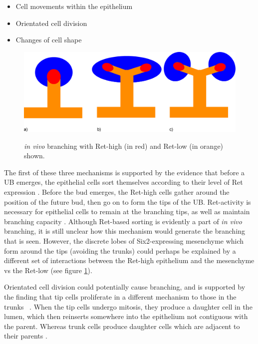 \documentclass[pdftex,10pt,a4paper,twocolumn]{article}
\begin{document}
\begin{itemize}
\item Cell movements within the epithelium
\item Orientated cell division
\item Changes of cell shape
\end{itemize}

\begin{figure}[t] 
\centering
\scalebox{0.2} 
{\includegraphics{UB_branch_ret.eps}}
\caption{\textit{in vivo} branching with Ret-high (in red) and Ret-low (in orange) shown.}\label{fig:branch_ret}
\end{figure} 

The first of these three mechanisms is supported by the evidence that before a UB emerges, the epithelial cells sort themselves according to their level of Ret expression \cite{Chi2009}. Before the bud emerges, the Ret-high cells gather around the position of the future bud, then go on to form the tips of the UB. Ret-activity is necessary for epithelial cells to remain at the branching tips, as well as maintain branching capacity \cite{Chi2009}. Although Ret-based sorting is evidently a part of \textit{in vivo} branching, it is still unclear how this mechanism would generate the branching that is seen. However, the discrete lobes of Six2-expressing mesenchyme which form around the tips (avoiding the trunks) could perhaps be explained by a different set of interactions between the Ret-high epithelium and the mesenchyme vs the Ret-low (see figure \ref{fig:branch_ret}).

Orientated cell division could potentially cause branching, and is supported by the finding that tip cells proliferate in a different mechanism to those in the trunks ~\cite{packard2013luminal}. When the tip cells undergo mitosis, they produce a daughter cell in the lumen, which then reinserts somewhere into the epithelium not contiguous with the parent. Whereas trunk cells produce daughter cells which are adjacent to their parents \cite{packard2013luminal}.
\end{document}
